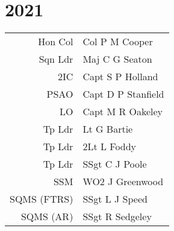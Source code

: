 \chapter*{2021}

\vspace*{10mm}

\begin{center}
  \small
  \begin{tabular}{rl}
    Hon Col & Col P M Cooper \\
    Sqn Ldr & Maj C G Seaton \\
    2IC & Capt S P Holland \\
    PSAO & Capt D P Stanfield \\
    LO & Capt M R Oakeley \\
    Tp Ldr & Lt G Bartie \\
    Tp Ldr & 2Lt L Foddy \\
    Tp Ldr & SSgt C J Poole \\
    SSM & WO2 J Greenwood \\
    SQMS (FTRS) & SSgt L J Speed \\
    SQMS (AR) & SSgt R Sedgeley \\
  \end{tabular}
\end{center}

\vspace*{5mm}

